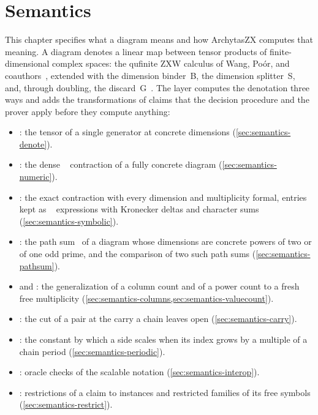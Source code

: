 \chapter{Semantics}\label{ch:semantics}

This chapter specifies what a diagram means and how ArchytasZX computes that meaning. A diagram denotes a linear map between tensor products of finite-dimensional complex spaces: the qufinite ZXW calculus of Wang, Poór, and coauthors~\cite{wang2021qufinite,poor2023zxw,wang2023qufinitezxw}, extended with the dimension binder~B, the dimension splitter~S, and, through doubling, the discard~G~\cite{selinger2007cpm,carette2019mixed}. The layer computes the denotation three ways and adds the transformations of claims that the decision procedure and the prover apply before they compute anything:
\begin{itemize}
\item {}: the tensor of a single generator at concrete dimensions (\cref{sec:semantics-denote}).
\item {}: the dense ~\cite{harris2020numpy} contraction of a fully concrete diagram (\cref{sec:semantics-numeric}).
\item {}: the exact contraction with every dimension and multiplicity formal, entries kept as ~\cite{meurer2017sympy} expressions with Kronecker deltas and character sums (\cref{sec:semantics-symbolic}).
\item {}: the path sum~\cite{amy2018pathsums} of a diagram whose dimensions are concrete powers of two or of one odd prime, and the comparison of two such path sums (\cref{sec:semantics-pathsum}).
\item {} and : the generalization of a column count and of a power count to a fresh free multiplicity (\cref{sec:semantics-columns,sec:semantics-valuecount}).
\item {}: the cut of a pair at the carry a chain leaves open (\cref{sec:semantics-carry}).
\item {}: the constant by which a side scales when its index grows by a multiple of a chain period (\cref{sec:semantics-periodic}).
\item {}: oracle checks of the scalable notation (\cref{sec:semantics-interop}).
\item {}: restrictions of a claim to instances and restricted families of its free symbols (\cref{sec:semantics-restrict}).
\end{itemize}

